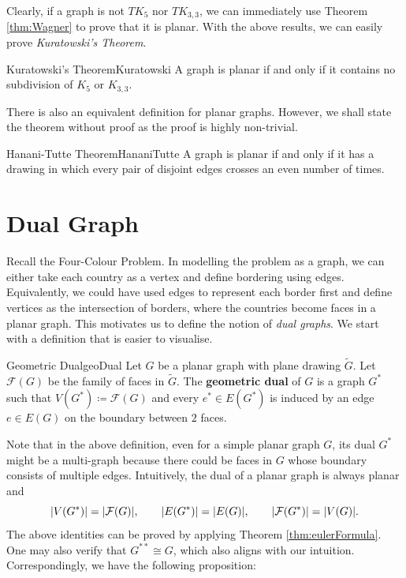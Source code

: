 \documentclass[math]{amznotes}
\theoremstyle{remark}
\newcommand{\0}{\mathbf{0}}
\newcommand{\1}{\mathbf{1}}
\begin{document}
Clearly, if a graph is not $TK_5$ nor $TK_{3, 3}$, we can immediately use Theorem \ref{thm:Wagner} to prove that it is planar. With the above results, we can easily prove \textit{Kuratowski's Theorem}.
\begin{thmbox}{Kuratowski's Theorem}{Kuratowski}
    A graph is planar if and only if it contains no subdivision of $K_5$ or $K_{3, 3}$.
\end{thmbox}
There is also an equivalent definition for planar graphs. However, we shall state the theorem without proof as the proof is highly non-trivial.
\begin{thmbox}{Hanani-Tutte Theorem}{HananiTutte}
    A graph is planar if and only if it has a drawing in which every pair of disjoint edges crosses an even number of times.
\end{thmbox}
\section{Dual Graph}
Recall the Four-Colour Problem. In modelling the problem as a graph, we can either take each country as a vertex and define bordering using edges. Equivalently, we could have used edges to represent each border first and define vertices as the intersection of borders, where the countries become faces in a planar graph. This motivates us to define the notion of \textit{dual graphs}. We start with a definition that is easier to visualise.
\begin{dfnbox}{Geometric Dual}{geoDual}
    Let $G$ be a planar graph with plane drawing $\tilde{G}$. Let $\mathcal{F}(G)$ be the family of faces in $\tilde{G}$. The {\color{red} \textbf{geometric dual}} of $G$ is a graph $G^*$ such that $V(G^*) \coloneqq \mathcal{F}(G)$ and every $e^* \in E(G^*)$ is induced by an edge $e \in E(G)$ on the boundary between $2$ faces.
\end{dfnbox}
Note that in the above definition, even for a simple planar graph $G$, its dual $G^*$ might be a multi-graph because there could be faces in $G$ whose boundary consists of multiple edges. Intuitively, the dual of a planar graph is always planar and 
\begin{equation*}
    {\left\lvert {V(G^*)} \right\rvert} = {\left\lvert {\mathcal{F}(G)} \right\rvert}, \qquad {\left\lvert {E(G^*)} \right\rvert} = {\left\lvert {E(G)} \right\rvert}, \qquad {\left\lvert {\mathcal{F}(G^*)} \right\rvert} = {\left\lvert {V(G)} \right\rvert}.
\end{equation*}
The above identities can be proved by applying Theorem \ref{thm:eulerFormula}. One may also verify that $G^{**} \cong G$, which also aligns with our intuition. Correspondingly, we have the following proposition:
\end{document}
